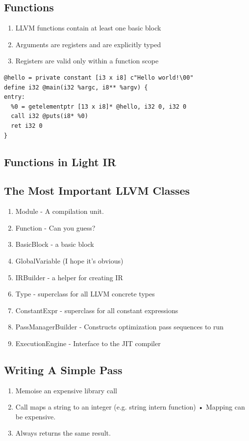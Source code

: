 \documentclass[a4paper]{exam}
\theoremstyle{definition}
\begin{document}
\subsection{Functions}
\begin{enumerate}
  \item LLVM functions contain at least one basic block
  \item Arguments are registers and are explicitly typed
  \item Registers are valid only within a function scope
\end{enumerate}
\begin{verbatim}
@hello = private constant [i3 x i8] c"Hello world!\00"
define i32 @main(i32 %argc, i8** %argv) {
entry:
  %0 = getelementptr [13 x i8]* @hello, i32 0, i32 0
  call i32 @puts(i8* %0)
  ret i32 0  
}
\end{verbatim}
\subsection{Functions in Light IR}


\subsection{The Most Important LLVM Classes}

\begin{enumerate}
  \item Module - A compilation unit.
  \item Function - Can you guess?
  \item BasicBlock - a basic block
  \item GlobalVariable (I hope it's obvious)
  \item IRBuilder - a helper for creating IR
  \item Type - superclass for all LLVM concrete types
  \item ConstantExpr - superclass for all constant expressions
  \item PassManagerBuilder - Constructs optimization pass sequences to run
  \item ExecutionEngine - Interface to the JIT compiler

\end{enumerate}

\subsection{Writing A Simple Pass}
\begin{enumerate}
  \item Memoise an expensive library call
  \item Call maps a string to an integer (e.g. string intern function) • Mapping can be expensive.
  \item Always returns the same result.
\end{enumerate}
\end{document}
